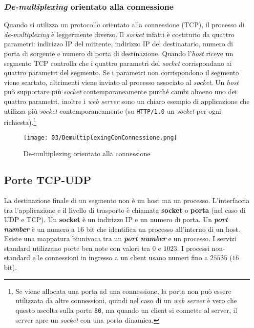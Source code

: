         \subsubsection{\textit{De-multiplexing} orientato alla connessione}
            Quando si utilizza un protocollo orientato alla connessione (\Acrshort*{TCP}), il processo di \textit{de-multiplexing} è leggermente diverso. Il \textit{socket} infatti è costituito da quattro parametri: indirizzo \Acrshort*{IP} del mittente, indirizzo \Acrshort*{IP} del destinatario, numero di porta di sorgente e numero di porta di destinazione. Quando l'\textit{host} riceve un segmento \Acrshort*{TCP} controlla che i quattro parametri del \textit{socket} corrispondano ai quattro parametri del segmento. Se i parametri non corrispondono il segmento viene scartato, altrimenti viene inviato al processo associato al \textit{socket}. Un \textit{host} può supportare più \textit{socket} contemporaneamente purché cambi almeno uno dei quattro parametri, inoltre i \textit{web server} sono un chiaro esempio di applicazione che utilizza più \textit{socket} contemporaneamente (su \texttt{HTTP/1.0} un \textit{socket} per ogni richiesta).\footnote{Se viene allocata una porta ad una connessione, la porta non può essere utilizzata da altre connessioni, quindi nel caso di un \textit{web server} è vero che questo ascolta sulla porta \texttt{80}, ma quando un client si connette al server, il server apre un \textit{socket} con una porta dinamica.}
            \begin{figure}[H]
                \centering
                \texttt{[image: 03/DemultiplexingConConnessione.png]}
                \caption{De-multiplexing orientato alla connessione}
            \end{figure}
    \subsection[Porte \texttt*{TCP}-\texttt{UDP}]{Porte \Acrshort*{TCP}-\Acrshort*{UDP}}
        La destinazione finale di un segmento non è un host ma un processo. L'interfaccia tra l'applicazione e il livello di trasporto è chiamata \textbf{socket} o \textbf{porta} (nel caso di \Acrshort*{UDP} e \Acrshort*{TCP}). Un \textbf{socket} è un indirizzo \Acrshort*{IP} e un numero di porta. Un \textit{\textbf{port number}} è un numero a $16$ bit che identifica un processo all'interno di un host. Esiste una mappatura biunivoca tra un \textit{\textbf{port number}} e un processo. I servizi standard utilizzano porte ben note con valori tra $0$ e $1023$. I processi non-standard e le connessioni in ingresso a un client usano numeri fino a $25535$ ($16$ bit).
